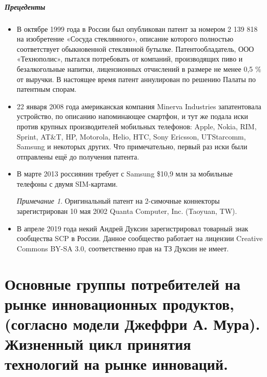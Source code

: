 \documentclass[11pt]{article}
\theoremstyle{plain} %
\theoremstyle{definition} %
\theoremstyle{remark} %
\newtheorem{nota}{Примечание}
\begin{document}
\subparagraph{Прецеденты}
\begin{itemize}
	\item В октябре 1999 года в России был опубликован патент за номером 2 139 818 на изобретение «Сосуда стеклянного», описание которого полностью соответствует обыкновенной стеклянной бутылке. Патентообладатель, ООО «Технополис», пытался потребовать от компаний, производящих пиво и безалкогольные напитки, лицензионных отчислений в размере не менее 0,5 \% от выручки. В настоящее время патент аннулирован по решению Палаты по патентным спорам.
	\item 22 января 2008 года американская компания Minerva Industries запатентовала устройство, по описанию напоминающее смартфон, и тут же подала иски против крупных производителей мобильных телефонов: Apple, Nokia, RIM, Sprint, AT&T, HP, Motorola, Helio, HTC, Sony Ericsson, UTStarcomm, Samsung и некоторых других. Что примечательно, первый раз иски были отправлены ещё до получения патента.
	\item В марте 2013 россиянин требует с Samsung \$10,9 млн за мобильные телефоны с двумя SIM-картами.
	\begin{nota}
		Оригинальный патент на 2-симочные коннекторы зарегистрирован 10 мая 2002 Quanta Computer, Inc. (Taoyuan, TW).
	\end{nota}
    \item В апреле 2019 года некий Андрей Дуксин зарегистрировал товарный знак сообщества SCP в России. Данное сообщество работает на лицензии Creative Commons BY-SA 3.0, соответственно прав на ТЗ Дуксин не имеет.
\end{itemize}

\newpage

\section{Основные группы потребителей на рынке инновационных продуктов, (согласно модели Джеффри А. Мура). Жизненный цикл принятия технологий на рынке инноваций.}\label{erste}
\end{document}
